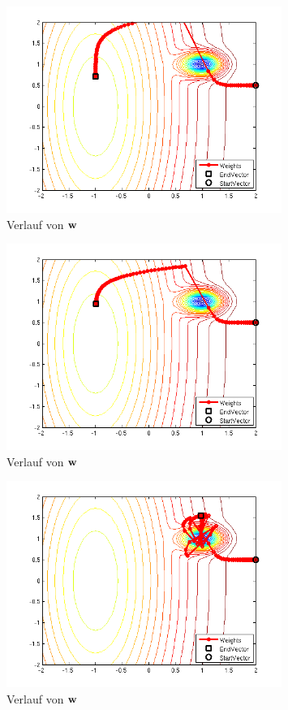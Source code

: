 \begin{figure}[h!]
  \centering
  \includegraphics[width=0.8\textwidth]{./figures/211/path_w01_eta02.png}
  \caption{Verlauf von $\mathbf{w}$}
  \label{fig:211_path_w01_eta02}
\end{figure}

\begin{figure}[h!]
  \centering
  \includegraphics[width=0.8\textwidth]{./figures/211/path_w01_eta015.png}
  \caption{Verlauf von $\mathbf{w}$}
  \label{fig:211_path_w01_eta015}
\end{figure}

\begin{figure}[h!]
  \centering
  \includegraphics[width=0.8\textwidth]{./figures/211/path_w01_eta01.png}
  \caption{Verlauf von $\mathbf{w}$}
  \label{fig:211_path_w01_eta01}
\end{figure}

